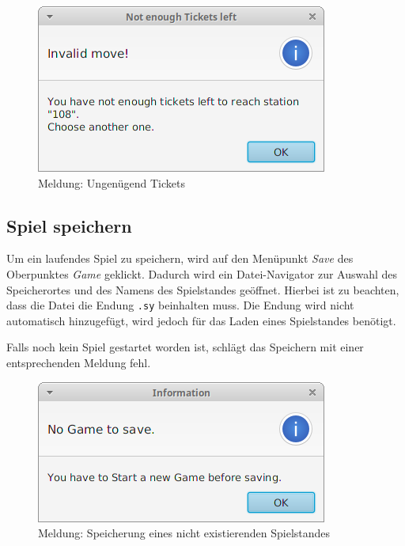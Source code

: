             \begin{figure}[H]
                \centering
                \includegraphics[scale=0.7]{img/benutzerhandbuch/dialog_not_enough_tickets.png}   
                \caption{Meldung: Ungenügend Tickets}
                \label{abb_dialog_not_enough_tickets}
            \end{figure}

        \subsection{Spiel speichern}
                Um ein laufendes Spiel zu speichern, wird auf den Menüpunkt \textit{Save} des Oberpunktes \textit{Game} geklickt.
                Dadurch wird ein Datei-Navigator zur Auswahl des Speicherortes und des Namens des Spielstandes geöffnet.
                Hierbei ist zu beachten, dass die Datei die Endung \texttt{.sy} beinhalten muss.
                Die Endung wird nicht automatisch hinzugefügt, wird jedoch für das Laden eines Spielstandes benötigt.

                Falls noch kein Spiel gestartet worden ist, schlägt das Speichern mit einer entsprechenden Meldung fehl.
                \begin{figure}[H]
                    \centering
                    \includegraphics[scale=0.7]{img/benutzerhandbuch/dialog_no_game_to_save.png}   
                    \caption{Meldung: Speicherung eines nicht existierenden Spielstandes}
                    \label{abb_dialog_no_game_to_save}
                \end{figure}

